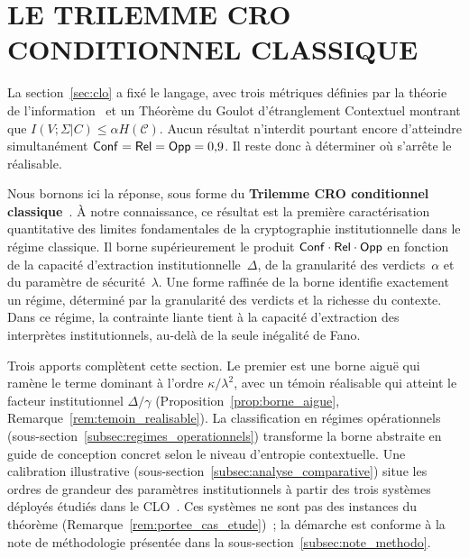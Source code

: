 
\section{LE TRILEMME CRO CONDITIONNEL CLASSIQUE}
\label{sec:cro_classique}
\begin{sloppypar}
La section~\ref{sec:clo} a fix\'e le langage, avec trois m\'etriques
d\'efinies par la th\'eorie de l'information~\cite{Shannon48,CoverThomas06} et un Th\'eor\`eme du Goulot d'\'etranglement
Contextuel montrant que $I(V;\Sigma|C) \leq \alpha H(\mathcal{C})$. Aucun r\'esultat n'interdit
pourtant encore d'atteindre simultan\'ement $\mathsf{Conf} = \mathsf{Rel} = \mathsf{Opp} = 0{,}9$. Il
reste donc \`a d\'eterminer o\`u s'arr\^ete le r\'ealisable.

Nous bornons ici la r\'eponse, sous forme du \textbf{Trilemme CRO
conditionnel classique}~\cite{MINKA2025CRO,MINKA2026CRO}. \`A notre connaissance, ce r\'esultat est la premi\`ere caract\'erisation quantitative
des limites fondamentales de la cryptographie institutionnelle dans le r\'egime
classique. Il borne sup\'erieurement le produit $\mathsf{Conf} \cdot \mathsf{Rel} \cdot \mathsf{Opp}$ en fonction de la capacit\'e
d'extraction institutionnelle~$\Delta$, de la granularit\'e des verdicts~$\alpha$ et
du param\`etre de s\'ecurit\'e~$\lambda$. Une forme raffin\'ee de la borne identifie
exactement un r\'egime, d\'etermin\'e par la granularit\'e des verdicts et la richesse
du contexte. Dans ce r\'egime, la contrainte liante tient \`a la capacit\'e d'extraction des interpr\`etes institutionnels, au-del\`a de la seule in\'egalit\'e de Fano.

Trois apports compl\`etent cette section. Le premier est une borne aigu\"e qui ram\`ene le
terme dominant \`a l'ordre $\kappa/\lambda^2$, avec un t\'emoin r\'ealisable qui atteint le facteur
institutionnel $\Delta/\gamma$ (Proposition~\ref{prop:borne_aigue}, Remarque~\ref{rem:temoin_realisable}).
La classification en
r\'egimes op\'erationnels (sous-section~\ref{subsec:regimes_operationnels}) transforme la
borne abstraite en guide de conception concret selon le niveau d'entropie
contextuelle. Une calibration illustrative (sous-section~\ref{subsec:analyse_comparative})
situe les ordres de grandeur des param\`etres institutionnels \`a partir des trois syst\`emes d\'eploy\'es \'etudi\'es
dans le CLO~\cite{Adida08,Groth16,Johnson01}. Ces syst\`emes ne sont pas des instances du th\'eor\`eme
(Remarque~\ref{rem:portee_cas_etude})~; la d\'emarche est conforme \`a la note de m\'ethodologie pr\'esent\'ee dans la sous-section~\ref{subsec:note_methodo}.


\end{sloppypar}

